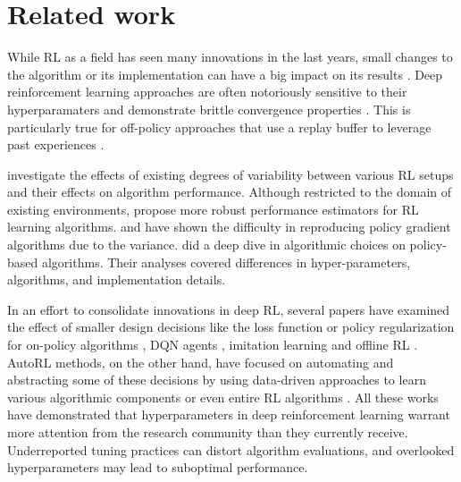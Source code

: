 \section{Related work}
\label{related_work}

While RL as a field has seen many innovations in the last
years, small changes to the algorithm or its implementation can have a big impact on its results \citep{engstrom2020implementation, joajo2021lifting}.  Deep reinforcement learning approaches are often notoriously sensitive to their hyperparamaters and demonstrate brittle convergence properties \citep{haarnoja2018soft}. This is particularly true for off-policy approaches that use a replay buffer to leverage past experiences \citep{duan2016benchmarking}.


\cite{Henderson2017DeepRL} investigate the effects of existing degrees of variability between various RL setups and their effects on algorithm performance. Although restricted to the domain of existing environments, \cite{Henderson2017DeepRL} propose more robust performance estimators for RL learning algorithms. \cite{islam2017reproducibility} and \cite{shengyi2022the37implementation} have shown the difficulty in reproducing policy gradient algorithms due to the variance.
\cite{andrychowicz2020matters} did a deep dive in algorithmic choices on policy-based algorithms. Their analyses covered differences in hyper-parameters, algorithms, and implementation details.


In an effort to consolidate innovations in deep RL, several papers have examined the effect of smaller design decisions like the loss function or policy regularization for on-policy algorithms \cite{andrychowicz2020matters}, DQN agents \citep{obando2020revisiting}, imitation learning \citep{hussenot2021hyperparameter} and offline RL \citep{paine2020hyperparameter, lu2021revisiting}. AutoRL methods, on the other hand, have focused on automating and abstracting some of these decisions \citep{parker2022automated, eimer2023hyperparameters} by using data-driven approaches to learn various algorithmic components or even entire RL algorithms \citep{co2021evolving,lu2022discovered}. All these works have demonstrated that hyperparameters in deep reinforcement learning warrant more attention from the research community than they currently receive. Underreported tuning practices can distort algorithm evaluations, and overlooked hyperparameters may lead to suboptimal performance.


